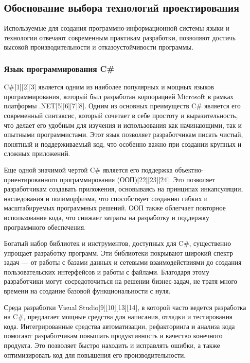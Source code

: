 \subsection{Обоснование выбора технологий проектирования}

Используемые для создания программно-информационной системы
языки и технологии отвечают современным практикам разработки, позволяют достичь высокой производительности и отказоустойчивости программы.

\subsubsection{Язык программирования C\#}

C\#[{1}][{2}][{3}] является одним из наиболее популярных и мощных языков программирования, который был разработан корпорацией Microsoft в рамках платформы .NET[{5}][{6}][{7}][{8}]. Одним из основных преимуществ C\# является его современный синтаксис, который сочетает в себе простоту и выразительность, что делает его удобным для изучения и использования как начинающими, так и опытными программистами. Этот язык позволяет разработчикам писать чистый, понятный и поддерживаемый код, что особенно важно при создании крупных и сложных приложений.

Еще одной значимой чертой C\# является его поддержка объектно-ориентированного программирования (ООП){[22]}{[23]}{[24]}. Это позволяет разработчикам создавать приложения, основываясь на принципах инкапсуляции, наследования и полиморфизма, что способствует созданию гибких и масштабируемых программных решений. ООП также облегчает повторное использование кода, что снижает затраты на разработку и поддержку программного обеспечения.

Богатый набор библиотек и инструментов, доступных для C\#, существенно упрощает разработку программ. Эти библиотеки покрывают широкий спектр задач — от работы с базами данных и сетевыми взаимодействиями до создания пользовательских интерфейсов и работы с файлами. Благодаря этому разработчики могут сосредоточиться на решении бизнес-задач, не тратя много времени на создание базовой функциональности с нуля.

Среда разработки Visual Studio[{9}][{10}][{13}][{14}], в которой часто ведется разработка на C\#, предлагает мощные средства для написания, отладки и тестирования кода. Интегрированные средства автоматизации, рефакторинга и анализа кода помогают разработчикам повышать продуктивность и качество конечного продукта. Это позволяет быстро находить и исправлять ошибки, а также оптимизировать код для повышения его производительности.

